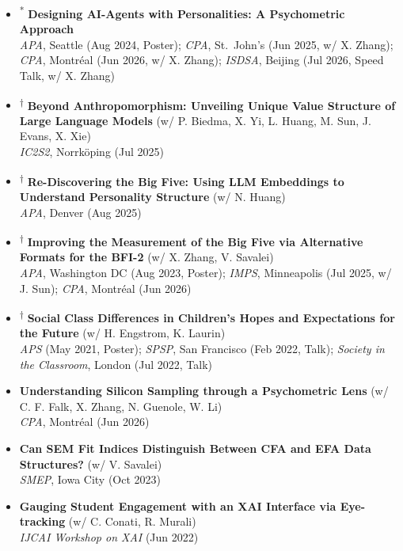 \documentclass[11pt,letterpaper]{article}
\begin{document}
\vspace{0.3em}
\begin{itemize}[itemsep=4pt]
    \item \textsuperscript{*} \textbf{Designing AI-Agents with Personalities: A Psychometric Approach}\\
    {\scriptsize \textit{APA}, Seattle (Aug 2024, Poster); \textit{CPA}, St.\ John's (Jun 2025, w/ X. Zhang); \textit{CPA}, Montréal (Jun 2026, w/ X. Zhang); \textit{ISDSA}, Beijing (Jul 2026, Speed Talk, w/ X. Zhang)}
    \item \textsuperscript{$\dagger$} \textbf{Beyond Anthropomorphism: Unveiling Unique Value Structure of Large Language Models} (w/ P. Biedma, X. Yi, L. Huang, M. Sun, J. Evans, X. Xie)\\
    {\scriptsize \textit{IC2S2}, Norrköping (Jul 2025)}
    \item \textsuperscript{$\dagger$} \textbf{Re-Discovering the Big Five: Using LLM Embeddings to Understand Personality Structure} (w/ N. Huang)\\
    {\scriptsize \textit{APA}, Denver (Aug 2025)}
    \item \textsuperscript{$\dagger$} \textbf{Improving the Measurement of the Big Five via Alternative Formats for the BFI-2} (w/ X. Zhang, V. Savalei)\\
    {\scriptsize \textit{APA}, Washington DC (Aug 2023, Poster); \textit{IMPS}, Minneapolis (Jul 2025, w/ J. Sun); \textit{CPA}, Montréal (Jun 2026)}
    \item \textsuperscript{$\dagger$} \textbf{Social Class Differences in Children's Hopes and Expectations for the Future} (w/ H. Engstrom, K. Laurin)\\
    {\scriptsize \textit{APS} (May 2021, Poster); \textit{SPSP}, San Francisco (Feb 2022, Talk); \textit{Society in the Classroom}, London (Jul 2022, Talk)}
    \item \textbf{Understanding Silicon Sampling through a Psychometric Lens} (w/ C. F. Falk, X. Zhang, N. Guenole, W. Li)\\
    {\scriptsize \textit{CPA}, Montréal (Jun 2026)}
    \item \textbf{Can SEM Fit Indices Distinguish Between CFA and EFA Data Structures?} (w/ V. Savalei)\\
    {\scriptsize \textit{SMEP}, Iowa City (Oct 2023)}
    \item \textbf{Gauging Student Engagement with an XAI Interface via Eye-tracking} (w/ C. Conati, R. Murali)\\
    {\scriptsize \textit{IJCAI Workshop on XAI} (Jun 2022)}
\end{itemize}
\end{document}
